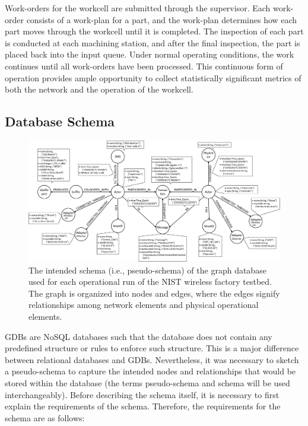 Work-orders for the workcell are submitted through the supervisor. Each work-order consists of a work-plan for a part, and the work-plan determines how each part moves through the workcell until it is completed. The inspection of each part is conducted at each machining station, and after the final inspection, the part is placed back into the input queue.  Under normal operating conditions, the work continues until all work-orders have been processed.  This continuous form of operation provides ample opportunity to collect statistically significant metrics of both the network and the operation of the workcell.

\subsection{Database Schema}\label{gdbappl:sec::dbschema}

\begin{figure}[!ht]
	\centering
	\includegraphics[width=\textwidth]{./chapter-gdb-appl/figures/database/graph_schema_0816.eps}
	\caption{The intended schema (i.e., pseudo-schema) of the graph database used for each operational run of the NIST wireless factory testbed.  The graph is organized into nodes and edges, where the edges signify relationships among network elements and physical operational elements.}
	\label{gdbappl:fig::database:schema}
\end{figure}

GDBs are NoSQL databases such that the database does not contain any predefined structure or rules to enforce such structure.  This is a major difference between relational databases and GDBs.  Nevertheless, it was necessary to sketch a pseudo-schema to capture the intended nodes and relationships that would be stored within the database (the terms pseudo-schema and schema will be used interchangeably). Before describing the schema itself, it is necessary to first explain the requirements of the schema.  Therefore, the requirements for the schema are as follows:

